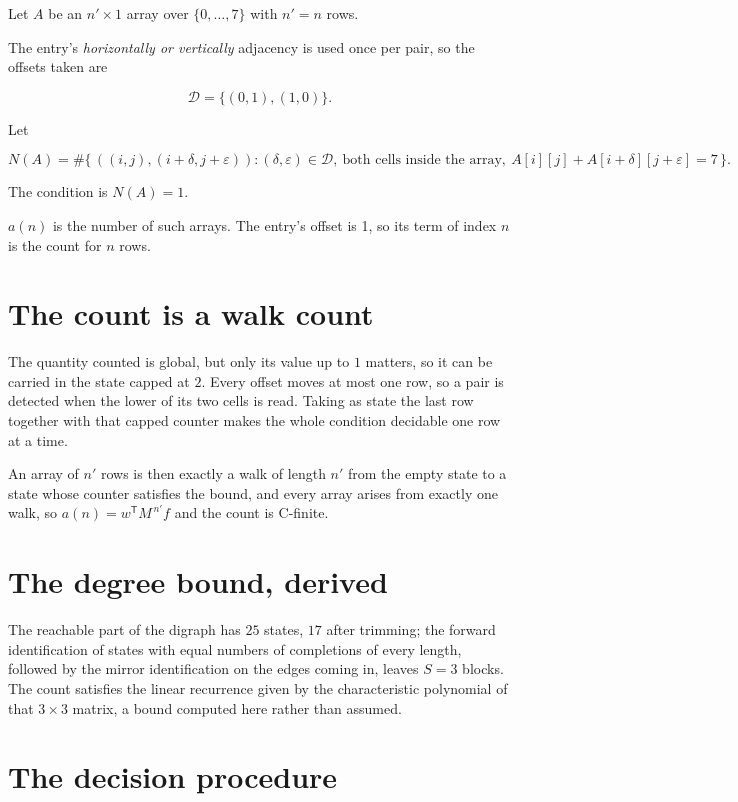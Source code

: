 \documentclass[11pt]{article}
\theoremstyle{definition}
\begin{document}
Let $A$ be an $n' \times 1$ array over $\{0,\dots,7\}$ with $n' = n$ rows.

The entry's {\itshape horizontally or vertically} adjacency is used once per pair, so the offsets taken are

\[\mathcal{D} = \{(0,1), (1,0)\}.\]

Let

\[N(A) = \#\bigl\{\,((i,j),(i{+}\delta,j{+}\varepsilon)) : (\delta,\varepsilon) \in \mathcal{D},\ \text{both cells inside the array},\ A[i][j] + A[i{+}\delta][j{+}\varepsilon] = 7\,\bigr\}.\]

The condition is $N(A) = 1$.

$a(n)$ is the number of such arrays. The entry's offset is 1, so its term of index $n$ is the count for $n$ rows.

\section{The count is a walk count}

The quantity counted is global, but only its value up to $1$ matters, so it can be carried in the state capped at $2$. Every offset moves at most one row, so a pair is detected when the lower of its two cells is read. Taking as state the last row together with that capped counter makes the whole condition decidable one row at a time.

An array of $n'$ rows is then exactly a walk of length $n'$ from the empty state to a state whose counter satisfies the bound, and every array arises from exactly one walk, so $a(n) = w^{\mathsf T}M^{\,n'}f$ and the count is C-finite.

\section{The degree bound, derived}

The reachable part of the digraph has $25$ states, $17$ after trimming; the forward identification of states with equal numbers of completions of every length, followed by the mirror identification on the edges coming in, leaves $S = 3$ blocks. The count satisfies the linear recurrence given by the characteristic polynomial of that $3\times3$ matrix, a bound computed here rather than assumed.

\section{The decision procedure}
\end{document}
